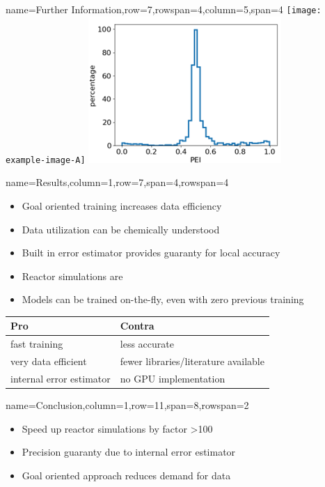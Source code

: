 \documentclass[
	accentcolor=3c,
	boxstyle=colored, %
	colorback=false,
	title=small
	]{tudasciposter}
\begin{document}
\begin{tcbposter}[
	poster={
		columns=8,
		rows=12,
		spacing=1cm,
	},]
\begin{posterboxenv}{name=Further Information,row=7,rowspan=4,column=5,span=4}
	\texttt{[image: example-image-A]}
	\includegraphics[width=.485\textwidth]{abb/GO_center_selection.png}
\end{posterboxenv}

\begin{posterboxenv}[title=3. Results]{name=Results,column=1,row=7,span=4,rowspan=4}
	\begin{itemize}
		\item Goal oriented training increases data efficiency
		\item Data utilization can be chemically understood
		\item Built in error estimator provides guaranty for local accuracy
		\item Reactor simulations are 
		\item Models can be trained on-the-fly, even with zero previous training
	\end{itemize}
	\vspace{2cm}
	\begin{tabularx}{\textwidth}{XX}
		\toprule
		Pro & Contra \\ \midrule
		fast training & less accurate \\ 
		very data efficient & fewer libraries/literature available\\
		internal error estimator & no GPU implementation\\		
		\bottomrule
	\end{tabularx}%
	


\end{posterboxenv}

\begin{posterboxenv}[title=4. Conclusion]{name=Conclusion,column=1,row=11,span=8,rowspan=2}
\begin{multicols}{2}		
	\begin{itemize}
		\item Speed up reactor simulations by factor >100
		\item Precision guaranty due to internal error estimator
		\item Goal oriented approach reduces demand for data
	\end{itemize}
\end{multicols}


\end{posterboxenv}
\end{tcbposter}
\end{document}
